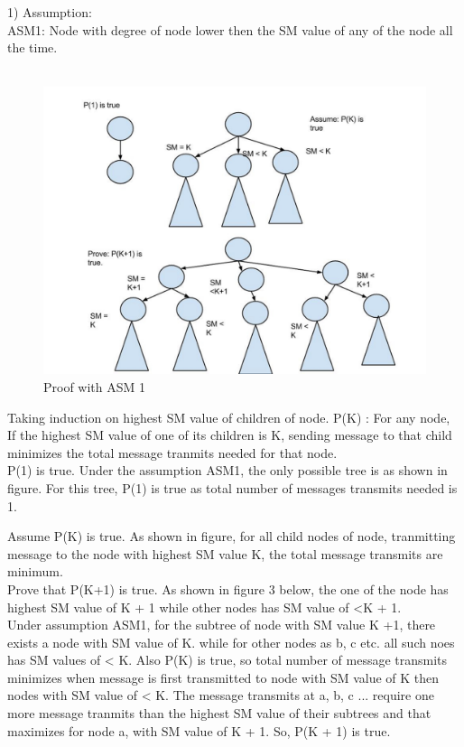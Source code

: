 1) Assumption: \\ ASM1: Node with degree of node lower then the SM value of any of the node all the time.\\\ 

\begin{figure}[4c]
    \centering
    \includegraphics[scale=0.10]{4c}
    \caption{Proof with ASM 1}
\end{figure}

Taking induction on highest SM value of children of node. 
P(K) : For any node, If the highest SM value of one of its children is K, sending message to that child minimizes the total message tranmits needed for that node.\\ 

P(1) is true. Under the assumption ASM1, the only possible tree is as shown in figure.
For this tree, P(1) is true as total number of messages transmits needed is 1. 

Assume P(K) is true.  As shown in figure, for all child nodes of node, tranmitting message to the node with highest SM value K, the total message transmits are minimum.\\

Prove that P(K+1) is true. As shown in figure 3 below, the one of the node has highest SM value of K + 1 while other nodes has SM value of <K + 1. \\

Under assumption ASM1, for the subtree of node with SM value K +1, there exists a node with SM value of K. while for other nodes as b, c etc. all such noes has SM values of < K. Also P(K) is true, so total number of message transmits minimizes when message is first transmitted to node with SM value of K then nodes with SM value of < K. The message transmits at a, b, c ... require one more message tranmits than the highest SM value of their subtrees and that maximizes for node a, with SM value of K + 1. So, P(K + 1) is true. \\

